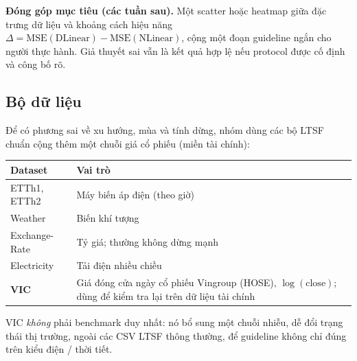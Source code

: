 \textbf{Đóng góp mục tiêu (các tuần sau).}
Một scatter hoặc heatmap giữa đặc trưng dữ liệu và khoảng cách hiệu năng
\(\Delta = \mathrm{MSE}(\mathrm{DLinear}) - \mathrm{MSE}(\mathrm{NLinear})\),
cộng một đoạn guideline ngắn cho người thực hành.
Giả thuyết sai vẫn là kết quả hợp lệ nếu protocol được cố định và công bố rõ.

\subsection{Bộ dữ liệu}

Để có phương sai về xu hướng, mùa và tính dừng, nhóm dùng các bộ LTSF chuẩn cộng thêm
một chuỗi giá cổ phiếu (miền tài chính):

\begin{center}
      \begin{tabular}{@{}ll@{}}
            \toprule
            \textbf{Dataset} & \textbf{Vai trò}                                                      \\
            \midrule
            ETTh1, ETTh2     & Máy biến áp điện (theo giờ)                                           \\
            Weather          & Biến khí tượng                                                        \\
            Exchange-Rate    & Tỷ giá; thường không dừng mạnh                                        \\
            Electricity      & Tải điện nhiều chiều                                                  \\
            \textbf{VIC}     & Giá đóng cửa ngày cổ phiếu Vingroup (HOSE), \(\log(\mathrm{close})\);
            dùng để kiểm tra lại trên dữ liệu tài chính                                              \\
            \bottomrule
      \end{tabular}
\end{center}

VIC \emph{không} phải benchmark duy nhất: nó bổ sung một chuỗi nhiễu, dễ đổi trạng thái thị trường,
ngoài các CSV LTSF thông thường, để guideline không chỉ đúng trên kiểu điện / thời tiết.
